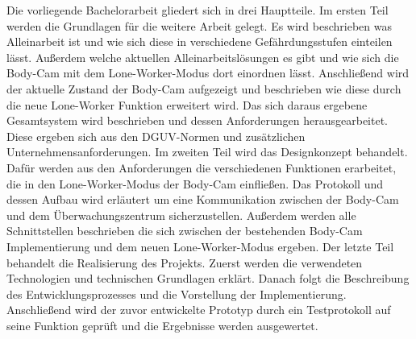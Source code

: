 \documentclass[thesis.tex]{subfiles}
\begin{document}
Die vorliegende Bachelorarbeit gliedert sich in drei Hauptteile.
Im ersten Teil werden die Grundlagen für die weitere Arbeit gelegt.
Es wird beschrieben was Alleinarbeit ist und wie sich diese in verschiedene Gefährdungsstufen einteilen lässt.
Außerdem welche aktuellen Alleinarbeitslösungen es gibt und wie sich die Body-Cam mit dem Lone-Worker-Modus dort einordnen lässt.
Anschließend wird der aktuelle Zustand der Body-Cam aufgezeigt und beschrieben wie diese durch die neue Lone-Worker Funktion erweitert wird.
Das sich daraus ergebene Gesamtsystem wird beschrieben und dessen Anforderungen herausgearbeitet.
Diese ergeben sich aus den DGUV-Normen und zusätzlichen Unternehmensanforderungen.
Im zweiten Teil wird das Designkonzept behandelt.
Dafür werden aus den Anforderungen die verschiedenen Funktionen erarbeitet, die in den Lone-Worker-Modus der Body-Cam einfließen.
Das Protokoll und dessen Aufbau wird erläutert um eine Kommunikation zwischen der Body-Cam und dem Überwachungszentrum sicherzustellen.
Außerdem werden alle Schnittstellen beschrieben die sich zwischen der bestehenden Body-Cam Implementierung und dem neuen Lone-Worker-Modus ergeben.
Der letzte Teil behandelt die Realisierung des Projekts.
Zuerst werden die verwendeten Technologien und technischen Grundlagen erklärt.
Danach folgt die Beschreibung des Entwicklungsprozesses und die Vorstellung der Implementierung.
Anschließend wird der zuvor entwickelte Prototyp durch ein Testprotokoll auf seine Funktion geprüft und die Ergebnisse werden ausgewertet.



\subfilebib %
\end{document}
